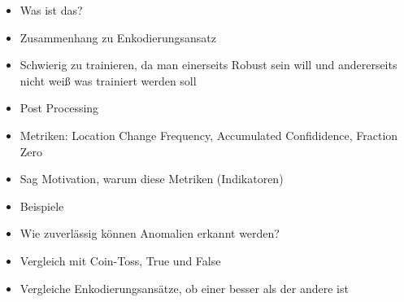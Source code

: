 \begin{itemize}
    \item Was ist das?
    \item Zusammenhang zu Enkodierungsansatz
    \item Schwierig zu trainieren, da man einerseits Robust sein will und andererseits nicht weiß was trainiert werden soll
    \item Post Processing
    \item Metriken: Location Change Frequency, Accumulated Confididence, Fraction Zero
    \item Sag Motivation, warum diese Metriken (Indikatoren)
    \item Beispiele
    \item Wie zuverlässig können Anomalien erkannt werden?
    \item Vergleich mit Coin-Toss, True und False
    \item Vergleiche Enkodierungsansätze, ob einer besser als der andere ist
\end{itemize}